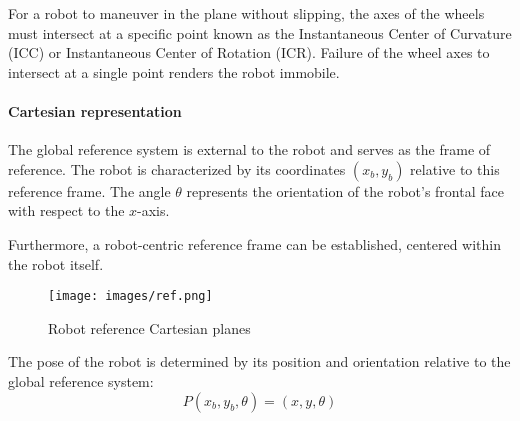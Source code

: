 For a robot to maneuver in the plane without slipping, the axes of the wheels must intersect at a specific point known as the Instantaneous Center of Curvature (ICC) or Instantaneous Center of Rotation (ICR).
Failure of the wheel axes to intersect at a single point renders the robot immobile.

\paragraph*{Cartesian representation}
The global reference system is external to the robot and serves as the frame of reference.
The robot is characterized by its coordinates $(x_b, y_b)$ relative to this reference frame. 
The angle $\theta$ represents the orientation of the robot's frontal face with respect to the $x$-axis.

Furthermore, a robot-centric reference frame can be established, centered within the robot itself.
\begin{figure}[H]
    \centering
    \texttt{[image: images/ref.png]} 
    \caption{Robot reference Cartesian planes}
\end{figure}
The pose of the robot is determined by its position and orientation relative to the global reference system:
\[P(x_b,y_b,\theta)=(x,y,\theta)\]